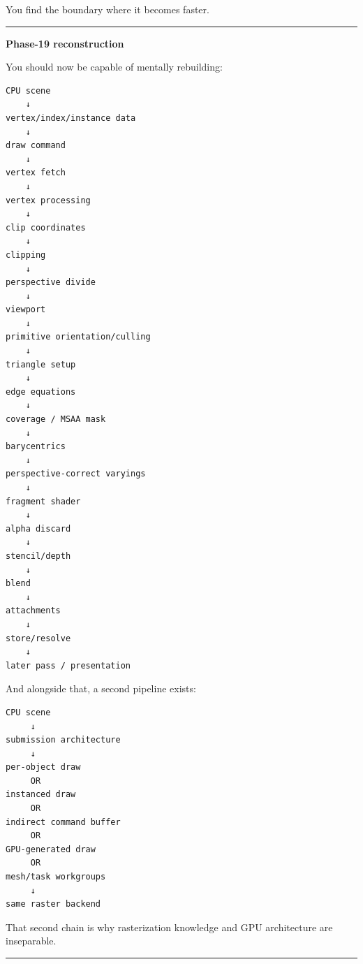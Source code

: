 You find the boundary where it becomes faster.

\begin{center}\rule{0.5\linewidth}{0.5pt}\end{center}

\textbf{Phase-19 reconstruction}

You should now be capable of mentally rebuilding:

\begin{verbatim}
CPU scene
    ↓
vertex/index/instance data
    ↓
draw command
    ↓
vertex fetch
    ↓
vertex processing
    ↓
clip coordinates
    ↓
clipping
    ↓
perspective divide
    ↓
viewport
    ↓
primitive orientation/culling
    ↓
triangle setup
    ↓
edge equations
    ↓
coverage / MSAA mask
    ↓
barycentrics
    ↓
perspective-correct varyings
    ↓
fragment shader
    ↓
alpha discard
    ↓
stencil/depth
    ↓
blend
    ↓
attachments
    ↓
store/resolve
    ↓
later pass / presentation
\end{verbatim}

And alongside that, a second pipeline exists:

\begin{verbatim}
CPU scene
     ↓
submission architecture
     ↓
per-object draw
     OR
instanced draw
     OR
indirect command buffer
     OR
GPU-generated draw
     OR
mesh/task workgroups
     ↓
same raster backend
\end{verbatim}

That second chain is why rasterization knowledge and GPU architecture are inseparable.

\begin{center}\rule{0.5\linewidth}{0.5pt}\end{center}

